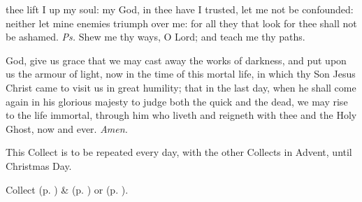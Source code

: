 	\fancyhead[RO,LE]{}
	\fancyhead[RE,LO]{}
	

   \label{AdventI}


\vspace{-0.2\baselineskip}

\introit

\vspace{-0.14\baselineskip}

 thee lift I up my soul: my God, in thee have I trusted, let me not be confounded: neither let mine enemies triumph over me: for all they that look for thee shall not be ashamed. \textit{Ps.} Shew me thy ways, O Lord; and teach me thy paths.

\vspace{-0.2\baselineskip}

\collect\label{AdventICollect}

\vspace{-0.13\baselineskip}

 God, give us grace that we may cast away the works of darkness, and put upon us the armour of light, now in the time of this mortal life, in which thy Son Jesus Christ came to visit us in great humility; that in the last day, when he shall come again in his glorious majesty to judge both the quick and the dead, we may rise to the life immortal, through him who liveth and reigneth with thee and the Holy Ghost, now and ever. \textit{Amen.}
\begin{rubric}
    This Collect is to be repeated every day, with the other Collects in Advent, until Christmas Day.
\end{rubric}

\begin{rubric}
     Collect  (p. \pageref{SPMaryInAdvent}) \&   (p. \pageref{SPAgainst}) or  (p. \pageref{SPChiefBishop}).
\end{rubric}

\vspace{-0.2\baselineskip}

